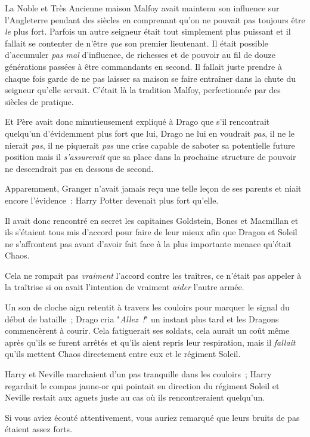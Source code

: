 La Noble et Très Ancienne maison Malfoy avait maintenu son influence sur l'Angleterre pendant des siècles en comprenant qu'on ne pouvait pas toujours être \emph{le} plus fort. Parfois un autre seigneur était tout simplement plus puissant et il fallait se contenter de n'être \emph{que} son premier lieutenant. Il était possible d'accumuler \emph{pas mal} d'influence, de richesses et de pouvoir au fil de douze générations passées à être commandants en second. Il fallait juste prendre à chaque fois garde de ne pas laisser sa maison se faire entraîner dans la chute du seigneur qu'elle servait. C'était là la tradition Malfoy, perfectionnée par des siècles de pratique.

Et Père avait donc minutieusement expliqué à Drago que s'il rencontrait quelqu'un d'évidemment plus fort que lui, Drago ne lui en voudrait \emph{pas}, il ne le nierait \emph{pas}, il ne piquerait \emph{pas} une crise capable de saboter sa potentielle future position mais il \emph{s'assurerait} que sa place dans la prochaine structure de pouvoir ne descendrait pas en dessous de second.

Apparemment, Granger n'avait jamais reçu une telle leçon de ses parents et niait encore l'évidence~: Harry Potter devenait plus fort qu'elle.

Il avait donc rencontré en secret les capitaines Goldstein, Bones et Macmillan et ils s'étaient tous mis d'accord pour faire de leur mieux afin que Dragon et Soleil ne s'affrontent pas avant d'avoir fait face à la plus importante menace qu'était Chaos.

Cela ne rompait pas \emph{vraiment} l'accord contre les traîtres, ce n'était pas appeler à la traîtrise si on avait l'intention de vraiment \emph{aider} l'autre armée.

Un son de cloche aigu retentit à travers les couloirs pour marquer le signal du début de bataille~; Drago cria "\emph{Allez~!}" un instant plus tard et les Dragons commencèrent à courir. Cela fatiguerait ses soldats, cela aurait un coût même après qu'ils se furent arrêtés et qu'ils aient repris leur respiration, mais il \emph{fallait} qu'ils mettent Chaos directement entre eux et le régiment Soleil.

\later

Harry et Neville marchaient d'un pas tranquille dans les couloirs~; Harry regardait le compas jaune-or qui pointait en direction du régiment Soleil et Neville restait aux aguets juste au cas où ils rencontreraient quelqu'un.

Si vous aviez écouté attentivement, vous auriez remarqué que leurs bruits de pas étaient assez forts.

